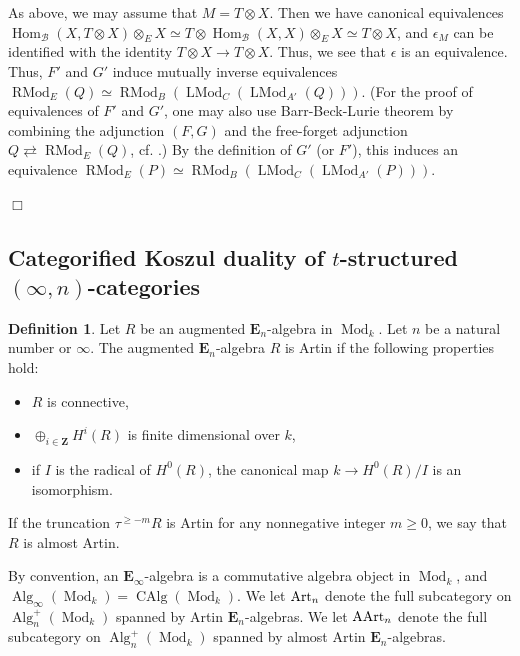 \documentclass[leqno,12pt]{amsart}
\theoremstyle{plain}
\theoremstyle{definition}
\newtheorem{Definition}[Theorem]{Definition}
\newcommand{\ZZ}{\mathbf{Z}}
\newcommand{\Hom}{\operatorname{Hom}}
\newcommand{\Mod}{\operatorname{Mod}}
\newcommand{\Alg}{\operatorname{Alg}}
\newcommand{\End}{\operatorname{End}}
\newcommand{\CAlg}{\operatorname{CAlg}}
\newcommand{\eenu}{\mathbf{E}_n}
\newcommand{\LMod}{\operatorname{LMod}}
\newcommand{\RMod}{\operatorname{RMod}}
\newcommand{\QED}{{\unskip\nobreak\hfil\penalty50\quad\null\nobreak\hfil
{$\Box$}\parfillskip0pt\finalhyphendemerits0\par\medskip}}
\begin{document}
As above, we may assume that $M=T\otimes X$.
Then we have canonical equivalences $\Hom_{\mathcal{B}}(X,T\otimes X)\otimes_EX\simeq T\otimes \Hom_{\mathcal{B}}(X,X)\otimes_EX\simeq T\otimes X$,
and $\epsilon_M$ can be identified with the identity $T\otimes X\to T\otimes X$. Thus, we see that $\epsilon$ is an equivalence. 
Thus, $F'$ and $G'$ induce mutually inverse equivalences $\RMod_E(Q)\simeq \RMod_{B}(\LMod_C(\LMod_{A'}(Q)))$.
(For the proof of equivalences of $F'$ and $G'$, one may also use Barr-Beck-Lurie theorem by combining the adjunction $(F,G)$ and the free-forget adjunction
$Q\rightleftarrows \RMod_E(Q)$, cf. \cite[4.7.3.16]{HA}.)
By the definition of $G'$ (or $F'$), this induces an equivalence $\RMod_E(P)\simeq \RMod_{B}(\LMod_C(\LMod_{A'}(P)))$.
\QED











\subsection{Categorified Koszul duality of $t$-structured $(\infty,n)$-categories}



\begin{Definition}
\label{defartin}
Let $R$ be an augmented $\eenu$-algebra in $\Mod_k$. Let $n$ be a natural number or $\infty$.
The augmented $\eenu$-algebra $R$ is Artin if the following properties hold:
\begin{itemize}
\item $R$ is connective,



\item $\oplus_{i\in \ZZ}H^{i}(R)$ is finite dimensional over $k$,


\item if $I$ is the radical of $H^0(R)$, the canonical map $k\to H^0(R)/I$ is an isomorphism.

\end{itemize}

If the truncation $\tau^{\ge -m}R$ is Artin for any nonnegative integer $m\ge 0$, we say that
$R$ is almost Artin.

By convention, an $\mathbf{E}_{\infty}$-algebra is a commutative algebra object in $\Mod_k$, and $\Alg_\infty(\Mod_k)=\CAlg(\Mod_k)$.
We let $\textup{Art}_n$ denote the full subcategory on $\Alg_n^+(\Mod_k)$ spanned by Artin $\eenu$-algebras.
We let $\textup{AArt}_n$ denote the full subcategory on $\Alg_n^+(\Mod_k)$ spanned by almost Artin $\eenu$-algebras.
\end{Definition}
\end{document}

